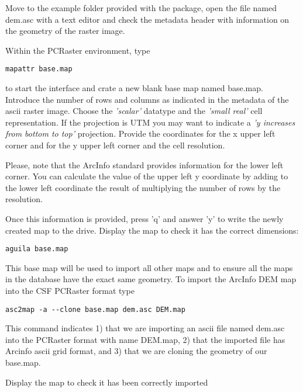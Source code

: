 Move to the example folder provided with the \echo package, open the file named \textsf{dem.asc} with a text editor and check the metadata header with information on the geometry of the raster image.

Within the PCRaster environment, type 

\begin{verbatim}
mapattr base.map
\end{verbatim}

to start the interface and crate a new blank base map named \textsf{base.map}. Introduce the number of rows and columns as indicated in the metadata of the ascii raster image. Choose the \textit{'scalar'} datatype and the \textit{'small real'} cell representation. If the projection is UTM you may want to indicate a \textit{'y increases from bottom to top'} projection. Provide the coordinates for the x upper left corner and for the y upper left corner and the cell resolution.
 
 \medskip 
\begin{Frame}
Please, note that the ArcInfo standard provides information for the lower left corner. You can calculate the value of the upper left y coordinate by adding to the lower left coordinate the result of multiplying the number of rows by the resolution.
\end{Frame}
 \medskip
 
Once this information is provided, press 'q' and answer 'y' to write the newly created map to the drive. Display the map to check it has the correct dimensions:

\begin{verbatim}
aguila base.map
\end{verbatim}
 
This base map will be used to import all other maps and to ensure all the maps in the database have the exact same geometry. To import the ArcInfo DEM map into the CSF PCRaster format type

\begin{verbatim}
asc2map -a --clone base.map dem.asc DEM.map
\end{verbatim}

This command indicates 1) that we are importing an ascii file named \textsf{dem.asc} into the PCRaster format with name \textsf{DEM.map}, 2) that the imported file has Arcinfo ascii grid format, and 3) that we are cloning the geometry of our base.map. 

Display the map to check it has been correctly imported

